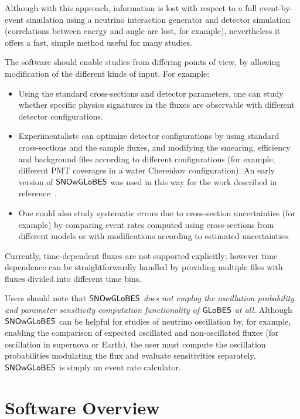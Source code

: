 \documentclass[12pt]{article}
\newcommand{\globes}{\sf{GLoBES}}
\newcommand{\snowglobes}{\sf{SNOwGLoBES}}
\begin{document}
Although with this approach, information is lost with respect to a
full event-by-event simulation using a neutrino interaction generator
and detector simulation (correlations between energy and angle are
lost, for example), nevertheless it offers a fast, simple method
useful for many studies.

The software should enable studies from differing points of view, by
allowing modification of the different kinds of input.  For example:

\begin{itemize}

\item Using the standard cross-sections and detector parameters, one
  can study whether specific physics signatures in the fluxes are observable
  with different detector configurations.

\item Experimentalists can optimize detector configurations by using
  standard cross-sections and the sample fluxes, and modifying the
  smearing, efficiency and background files according to different configurations
  (for example, different PMT coverages in a water Cherenkov configuration).  An early version of $\snowglobes$ was used in this way for the work described in reference~\cite{pwgstudy}.

\item
One could also study systematic errors due to cross-section
uncertainties (for example) by comparing event rates computed using cross-sections
from different models or with modifications according to estimated
uncertainties.

\end{itemize}

Currently, time-dependent fluxes are not supported explicitly; however
time dependence can be straightforwardly handled by providing multiple
files with fluxes divided into different time bins.

Users should note that \textit{$\snowglobes$ does not employ the oscillation probability and parameter sensitivity computation functionality of $\globes$ at all}.  Although $\snowglobes$ can be helpful for studies of neutrino oscillation by, for example, enabling the comparison of expected  oscillated and non-oscillated fluxes (for oscillation in supernova or Earth), the user must compute the oscillation probabilities modulating the flux and evaluate sensitivities separately.
$\snowglobes$ is simply an event rate calculator.

\section{Software Overview}
\end{document}
